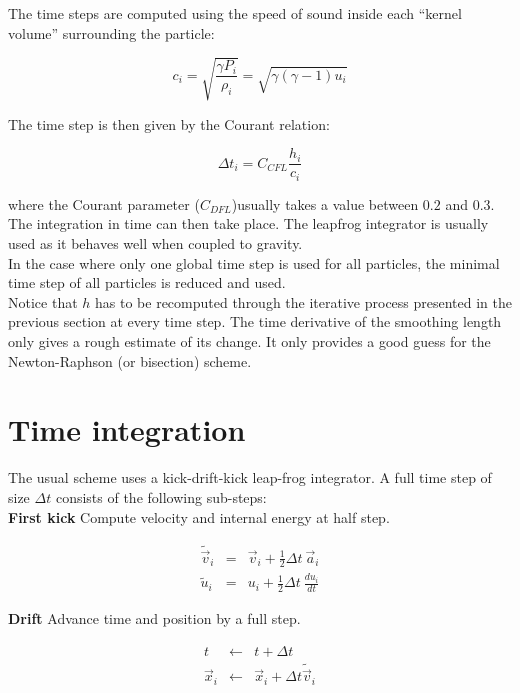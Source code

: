 \documentclass[a4paper,10pt]{article}
\begin{document}
The time steps are computed using the speed of sound inside each ``kernel volume'' surrounding the particle:

\begin{equation}
 c_i = \sqrt{\frac{\gamma P_i}{\rho_i}} = \sqrt{\gamma (\gamma-1)u_i}
\end{equation}

The time step is then given by the Courant relation:

\begin{equation}
 \Delta t_i = C_{CFL} \frac{h_i}{c_i}
\label{eq:dt}
\end{equation}

where the Courant parameter ($C_{DFL}$)usually takes a value between $0.2$ and $0.3$. The integration in time can then
take place. The
leapfrog integrator is usually used as it behaves well when coupled to gravity. \\
In the case where only one global time step is used for all particles, the minimal time step of all particles is reduced
and used. \\

Notice that $h$ has to be recomputed through the iterative process
presented in the previous section at every time step. The time
derivative of the smoothing length only gives a rough estimate of its
change. It only provides a good guess for the Newton-Raphson (or
bisection) scheme.

\section{Time integration}

The usual scheme uses a kick-drift-kick leap-frog integrator. A full time step of size $\Delta t$ consists of the
following sub-steps: \\

\textbf{First kick} Compute velocity and internal energy at half step.

\begin{eqnarray*}
 \tilde {\vec{v}}_i &=& \vec{v}_i + \textstyle\frac{1}{2}\Delta t ~\vec{a}_i \\
 \tilde u_i &=& u_i + \textstyle\frac{1}{2}\Delta t ~\frac{du_i}{dt}
\end{eqnarray*}

\textbf{Drift} Advance time and position by a full step.

\begin{eqnarray*}
 t &\leftarrow& t + \Delta t \\
 \vec{x}_i &\leftarrow& \vec{x}_i + \Delta t \tilde {\vec{v}}_i\\
\end{eqnarray*}
\end{document}

